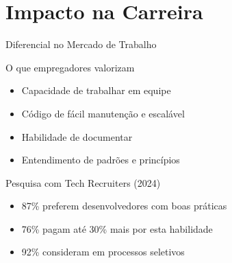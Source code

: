 \documentclass[10pt, aspectratio=169]{beamer}
\begin{document}
\section{Impacto na Carreira}
\begin{frame}{Diferencial no Mercado de Trabalho}
\begin{block}{O que empregadores valorizam}
\begin{itemize}
    \item Capacidade de trabalhar em equipe
    \item Código de fácil manutenção e escalável
    \item Habilidade de documentar
    \item Entendimento de padrões e princípios
\end{itemize}
\end{block}

\begin{exampleblock}{Pesquisa com Tech Recruiters (2024)}
\begin{itemize}
    \item 87\% preferem desenvolvedores com boas práticas
    \item 76\% pagam até 30\% mais por esta habilidade
    \item 92\% consideram em processos seletivos
\end{itemize}
\end{exampleblock}
\end{frame}
\end{document}
